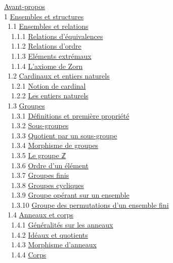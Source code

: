 \documentclass[]{article}
\begin{document}
\href{coursch1.html\#x2-1000}{Avant-propos} \\ 1
\href{coursch2.html\#x4-60001}{Ensembles et structures} \\ ~1.1
\href{coursse1.html\#x5-70001.1}{Ensembles et relations} \\ ~~1.1.1
\href{coursse1.html\#x5-80001.1.1}{Relations d'équivalences} \\ ~~1.1.2
\href{coursse1.html\#x5-90001.1.2}{Relations d'ordre} \\ ~~1.1.3
\href{coursse1.html\#x5-100001.1.3}{Eléments extrémaux} \\ ~~1.1.4
\href{coursse1.html\#x5-110001.1.4}{L'axiome de Zorn} \\ ~1.2
\href{coursse2.html\#x6-120001.2}{Cardinaux et entiers naturels} \\
~~1.2.1 \href{coursse2.html\#x6-130001.2.1}{Notion de cardinal} \\
~~1.2.2 \href{coursse2.html\#x6-140001.2.2}{Les entiers naturels} \\
~1.3 \href{coursse3.html\#x7-150001.3}{Groupes} \\ ~~1.3.1
\href{coursse3.html\#x7-160001.3.1}{Définitions et première propriété}
\\ ~~1.3.2 \href{coursse3.html\#x7-170001.3.2}{Sous-groupes} \\ ~~1.3.3
\href{coursse3.html\#x7-180001.3.3}{Quotient par un sous-groupe} \\
~~1.3.4 \href{coursse3.html\#x7-190001.3.4}{Morphisme de groupes} \\
~~1.3.5 \href{coursse3.html\#x7-200001.3.5}{Le groupe ℤ} \\ ~~1.3.6
\href{coursse3.html\#x7-210001.3.6}{Ordre d'un élément} \\ ~~1.3.7
\href{coursse3.html\#x7-220001.3.7}{Groupes finis} \\ ~~1.3.8
\href{coursse3.html\#x7-230001.3.8}{Groupes cycliques} \\ ~~1.3.9
\href{coursse3.html\#x7-240001.3.9}{Groupe opérant sur un ensemble} \\
~~1.3.10 \href{coursse3.html\#x7-250001.3.10}{Groupe des permutations
d'un ensemble fini} \\ ~1.4 \href{coursse4.html\#x8-260001.4}{Anneaux et
corps} \\ ~~1.4.1 \href{coursse4.html\#x8-270001.4.1}{Généralités sur
les anneaux} \\ ~~1.4.2 \href{coursse4.html\#x8-280001.4.2}{Idéaux et
quotients} \\ ~~1.4.3 \href{coursse4.html\#x8-290001.4.3}{Morphisme
d'anneaux} \\ ~~1.4.4 \href{coursse4.html\#x8-300001.4.4}{Corps} \\
\end{document}
